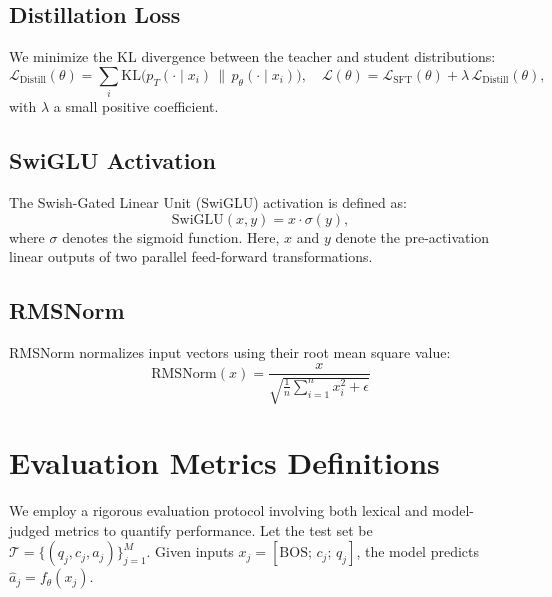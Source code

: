 \documentclass[]{interact}
\theoremstyle{plain}%
\theoremstyle{definition}
\theoremstyle{remark}
\begin{document}
\subsection{Distillation Loss}
We minimize the KL divergence between the teacher and student distributions:
\begin{equation}
\mathcal{L}_{\mathrm{Distill}}(\theta) = \sum_{i} \mathrm{KL}\big(p_T(\cdot\mid x_i)\,\big\|\, p_{\theta}(\cdot\mid x_i)\big),\quad \mathcal{L}(\theta) = \mathcal{L}_{\mathrm{SFT}}(\theta) + \lambda \, \mathcal{L}_{\mathrm{Distill}}(\theta),
\end{equation}
with \(\lambda\) a small positive coefficient.

\subsection{SwiGLU Activation}
The Swish-Gated Linear Unit (SwiGLU) activation is defined as:
\begin{equation}
    \text{SwiGLU}(x, y) = x \cdot \sigma(y),
\end{equation}
where $\sigma$ denotes the sigmoid function. Here, $x$ and $y$ denote the pre-activation linear outputs of two parallel feed-forward transformations.

\subsection{RMSNorm}
RMSNorm normalizes input vectors using their root mean square value:
\begin{equation}
    \text{RMSNorm}(x) = \frac{x}{\sqrt{\frac{1}{n} \sum_{i=1}^{n} x_i^2 + \epsilon}}
\end{equation}

\section{Evaluation Metrics Definitions}\label{secA3}

We employ a rigorous evaluation protocol involving both lexical and model-judged metrics to quantify performance. Let the test set be \(\mathcal{T}=\{(q_j,c_j,a_j)\}_{j=1}^{M}\). Given inputs \(x_j=[\mathrm{BOS};\,c_j;\,q_j]\), the model predicts \(\hat{a}_j=f_{\theta}(x_j)\).
\end{document}
